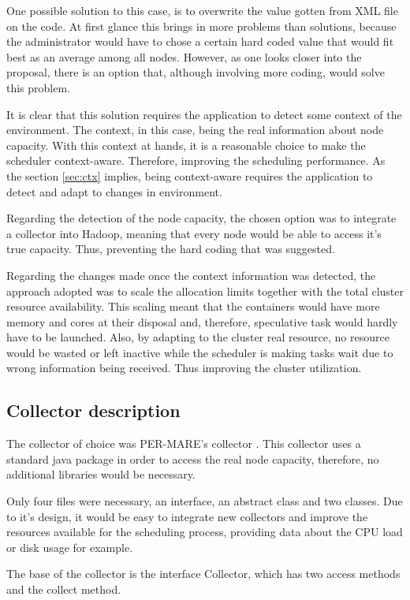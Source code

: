 One possible solution to this case, is to overwrite the value gotten from XML file on the code. At first glance this brings in more problems than solutions, because the administrator would have to chose a certain hard coded value that would fit best as an average among all nodes. However, as one looks closer into the proposal, there is an option that, although involving more coding, would solve this problem. 

It is clear that this solution requires the application to detect some context of the environment. The context, in this case, being the real information about node capacity. With this context at hands, it is a reasonable choice to make the scheduler context-aware. Therefore, improving the scheduling performance. As the section \ref{sec:ctx} implies, being context-aware requires the application to detect and adapt to changes in environment.

Regarding the detection of the node capacity, the chosen option was to integrate a collector into Hadoop, meaning that every node would be able to access it's true capacity. Thus, preventing the hard coding that was suggested.

Regarding the changes made once the context information was detected, the approach adopted was to scale the allocation limits together with the total cluster resource availability. This scaling meant that the containers would have more memory and cores at their disposal and, therefore, speculative task would hardly have to be launched. Also, by adapting to the cluster real resource, no resource would be wasted or left inactive while the scheduler is making tasks wait due to wrong information being received. Thus improving the cluster utilization.

\subsection{Collector description}
The collector of choice was PER-MARE's collector \cite{Collector}. This collector uses a standard java package in order to access the real node capacity, therefore, no additional libraries would be necessary.
 
Only four files were necessary, an interface, an abstract class and two classes. Due to it's design, it would be easy to integrate new collectors and improve the resources available for the scheduling process, providing data about the CPU load or disk usage for example.

The base of the collector is the interface Collector, which has two access methods and the collect method. 

